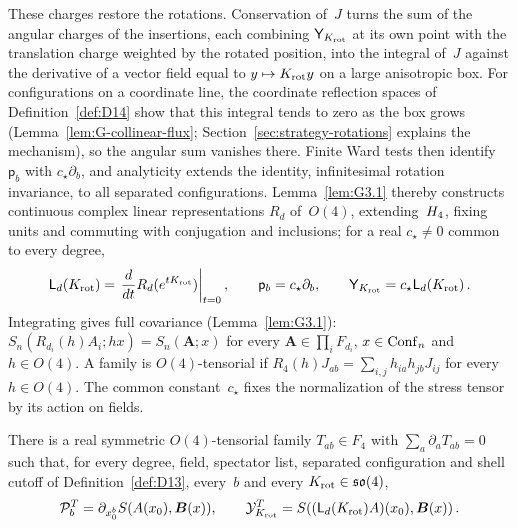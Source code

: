 These charges restore the rotations. Conservation of~$J$ turns the sum of the angular charges of the insertions, each combining $\mathsf Y_{K_{\rm rot}}$ at its own point with the translation charge weighted by the rotated position, into the integral of~$J$ against the derivative of a vector field equal to $y\mapsto K_{\rm rot}y$ on a large anisotropic box. For configurations on a coordinate line, the coordinate reflection spaces of Definition~\ref{def:D14} show that this integral tends to zero as the box grows (Lemma~\ref{lem:G-collinear-flux}; Section~\ref{sec:strategy-rotations} explains the mechanism), so the angular sum vanishes there. Finite Ward tests then identify $\mathsf p_b$ with $c_\star\partial_b$, and analyticity extends the identity, infinitesimal rotation invariance, to all separated configurations. Lemma~\ref{lem:G3.1} thereby constructs continuous complex linear representations $R_d$ of~$O(4)$, extending~$H_4$, fixing units and commuting with conjugation and inclusions; for a real $c_\star\ne0$ common to every degree,
\begin{equation*}
\mathsf L_d(K_{\rm rot})=\left.\frac{d}{dt}R_d(e^{tK_{\rm rot}})\right|_{t=0},
\qquad \mathsf p_b=c_\star\partial_b,\qquad
\mathsf Y_{K_{\rm rot}}=c_\star\mathsf L_d(K_{\rm rot})\,.
\end{equation*}
Integrating gives full covariance (Lemma~\ref{lem:G3.1}): $S_n(R_{d_i}(h)A_i;hx)=S_n(\boldsymbol A;x)$ for every $\boldsymbol A\in\prod_iF_{d_i}$, $x\in\mathrm{Conf}_{n}$ and $h\in O(4)$. A family is $O(4)$-tensorial if $R_4(h)J_{ab}=\sum_{i,j}h_{ia}h_{jb}J_{ij}$ for every $h\in O(4)$. The common constant~$c_\star$ fixes the normalization of the stress tensor by its action on fields.

\begin{theorem}\label{prop:ST}\label{thm:ST}
There is a real symmetric $O(4)$-tensorial family $T_{ab}\in F_4$ with $\sum_a\partial_aT_{ab}=0$ such that, for every degree, field, spectator list, separated configuration and shell cutoff of Definition~\ref{def:D13}, every~$b$ and every $K_{\rm rot}\in\mathfrak{so}(4)$,
\begin{equation*}
\mathcal P_b^T=\partial_{x_0^b}S(A(x_0),\boldsymbol B(x)),\qquad
\mathcal Y_{K_{\rm rot}}^T=S((\mathsf L_d(K_{\rm rot})A)(x_0),\boldsymbol B(x))\,.
\end{equation*}
\end{theorem}

